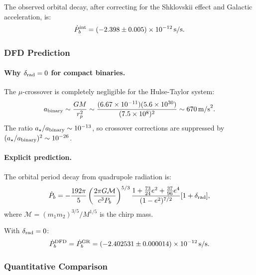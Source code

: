 The observed orbital decay, after correcting for the Shklovskii effect and Galactic acceleration, is:
\begin{equation}\label{eq:pdot-obs}
\dot{P}_b^{\rm int} = (-2.398 \pm 0.005) \times 10^{-12}\,\text{s/s}.
\end{equation}

\subsubsection{DFD Prediction}\label{sec:gw-dfd-pulsar}

\paragraph{Why $\delta_{\rm rad} = 0$ for compact binaries.}
The $\mu$-crossover is completely negligible for the Hulse-Taylor system:
\begin{equation}
a_{\rm binary} \sim \frac{GM}{r_p^2} \sim \frac{(6.67 \times 10^{-11})(5.6 \times 10^{30})}{(7.5 \times 10^8)^2} \sim 670\,\text{m/s}^2.
\end{equation}
The ratio $a_\star/a_{\rm binary} \sim 10^{-13}$, so crossover corrections are suppressed by $(a_\star/a_{\rm binary})^2 \sim 10^{-26}$.

\paragraph{Explicit prediction.}
The orbital period decay from quadrupole radiation is:
\begin{equation}\label{eq:pdot-formula}
\dot{P}_b = -\frac{192\pi}{5}\left(\frac{2\pi G\mathcal{M}}{c^3 P_b}\right)^{5/3}\frac{1 + \frac{73}{24}e^2 + \frac{37}{96}e^4}{(1-e^2)^{7/2}}[1 + \delta_{\rm rad}],
\end{equation}
where $\mathcal{M} = (m_1 m_2)^{3/5}/M^{1/5}$ is the chirp mass.

With $\delta_{\rm rad} = 0$:
\begin{equation}\label{eq:pdot-dfd}
\dot{P}_b^{\rm DFD} = \dot{P}_b^{\rm GR} = (-2.402531 \pm 0.000014) \times 10^{-12}\,\text{s/s}.
\end{equation}

\subsubsection{Quantitative Comparison}\label{sec:gw-comparison}

